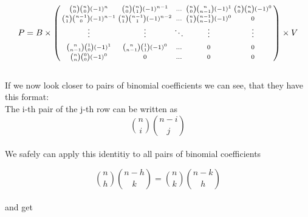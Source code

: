 \begin{gather*}
    P=B \times
    \begin{psmallmatrix}
        {n \choose 0}{n \choose 0}  (-1)^{n}   & {n \choose 0}{n \choose 1}  (-1)^{n-1} & \hdots & {n \choose 0}{n \choose n-1}  (-1)^{1} & {n \choose 0}{n \choose n}(-1)^{0} \\
        {n \choose 1}{n-1 \choose 0}(-1)^{n-1} & {n \choose 1}{n-1 \choose 1}(-1)^{n-2} & \hdots & {n \choose 1}{n-1 \choose n-1}(-1)^{0} & 0                                  \\
        \vdots                                 & \vdots                                 & \ddots & \vdots                                 & \vdots                             \\
        & \\
        {n \choose n-1}{1 \choose 0}(-1)^{1}   & {n \choose n-1}{1 \choose 1}(-1)^{0}   & \hdots & 0                                      & 0                                  \\
        {n \choose n}  {0 \choose 0}(-1)^{0}   & 0                                      & \hdots & 0                                      & 0                                  \\
    \end{psmallmatrix}
    \times
    V
\end{gather*}
\\
If we now look closer to pairs of binomial coefficients we can see, that they have this format:
\\

The i-th pair of the j-th row can be written as
\begin{equation*}
    {n \choose i}{n-i \choose j}
\end{equation*}
\\
We safely can apply this identitiy to all pairs of binomial coefficients

\begin{equation*}
    {n \choose h}{n-h \choose k} = {n \choose k}{n-k \choose h}
\end{equation*}
\\
and get

